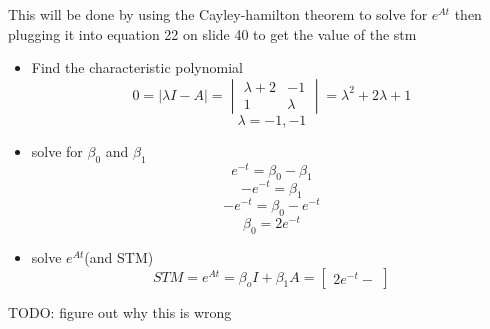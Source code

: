 \begin{enumerate}
    This will be done by using the Cayley-hamilton theorem to solve for $e^{At}$ then plugging it into 
    equation 22 on slide 40 to get the value of the stm
    \begin{itemize}
    \item Find the characteristic polynomial \\
      \begin{equation}
        0 = |\lambda I - A| =
        \begin{vmatrix}
          \lambda +2 & -1 \\
          1 & \lambda 
        \end{vmatrix} =
        \lambda^2 + 2\lambda + 1
      \end{equation}
      \begin{equation}
        \lambda = -1,-1
      \end{equation}
    \item solve for $\beta_0$ and $\beta_1$ \\
      \begin{equation}
        e^{-t} = \beta_0 - \beta_1
      \end{equation}
      \begin{equation}
        -e^{-t} = \beta_1
      \end{equation}
      \begin{equation}
        -e^{-t} = \beta_0 - e^{-t}
      \end{equation}
      \begin{equation}
        \beta_0 =2e^{-t}
      \end{equation}
    \item solve $e^{At}$(and STM)
      \begin{equation}
        STM = e^{At} = \beta_oI + \beta_1A =
        \begin{bmatrix}
          2e^{-t}-
        \end{bmatrix}
      \end{equation}
    \end{itemize}
  \end{enumerate}
  {\LARGE \color{red} TODO: figure out why this is wrong} 